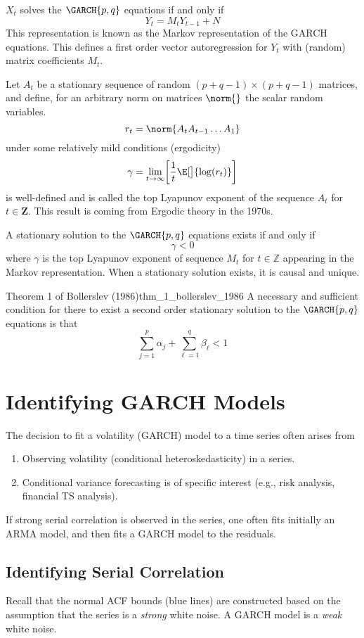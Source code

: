 \begin{Theorem}{}{}
    $X_{t}$ solves the $ \GARCH{p,q} $ equations if and only if
    \[
        Y_{t}=M_{t} Y_{t-1}+N
    \]
    This representation is known as the Markov representation of the GARCH equations.
    This defines a first order vector autoregression for $Y_{t}$ with
    (random) matrix coefficients $M_{t}$.
\end{Theorem}
Let $A_{t}$ be a stationary sequence of random $(p+q-1) \times (p+q-1)$ matrices, and define,
for an arbitrary norm on matrices $\norm{}$ the scalar random variables.
\[ r_{t}=\norm{A_{t} A_{t-1} \ldots A_{1}} \]
under some relatively mild conditions (ergodicity)
\[ \gamma=\lim\limits_{{t} \to {\infty}}\biggl[\frac{1}{t} \E[\big]{\log(r_{t})}\biggr] \]
is well-defined and is called the top Lyapunov exponent of the sequence
$A_{t}$ for $t \in \mathbf{Z}$.
This result is coming from Ergodic theory in the 1970s.
\begin{Theorem}{}{}
    A stationary solution to the $ \GARCH{p,q} $ equations exists if and only if
    \[ \gamma<0 \]
    where $\gamma$ is the top Lyapunov exponent of sequence
    $M_{t}$ for $t \in \mathbb{Z}$ appearing in the Markov representation.
    When a stationary solution exists, it is causal and unique.
\end{Theorem}
\begin{Theorem}{Theorem 1 of Bollerslev (1986)}{thm_1_bollerslev_1986}
    A necessary and sufficient condition for there to exist a second order stationary
    solution to the $ \GARCH{p,q} $ equations is that
    \[ \sum_{j=1}^{p} \alpha_{j}+\sum_{\ell=1}^{q} \beta_{\ell}<1 \]
\end{Theorem}

\section{Identifying GARCH Models}
The decision to fit a volatility (GARCH) model to a time series often
arises from
\begin{enumerate}[(1)]
    \item Observing volatility (conditional heteroskedasticity)
          in a series.
    \item Conditional variance forecasting is of specific interest
          (e.g., risk analysis, financial TS analysis).
\end{enumerate}
If strong serial correlation is observed in the series, one
often fits initially an ARMA model, and then
fits a GARCH model to the residuals.
\subsection*{Identifying Serial Correlation}
Recall that the normal ACF bounds (blue lines)
are constructed based on the assumption that
the series is a \emph{strong} white noise. A GARCH
model is a \emph{weak} white noise.

